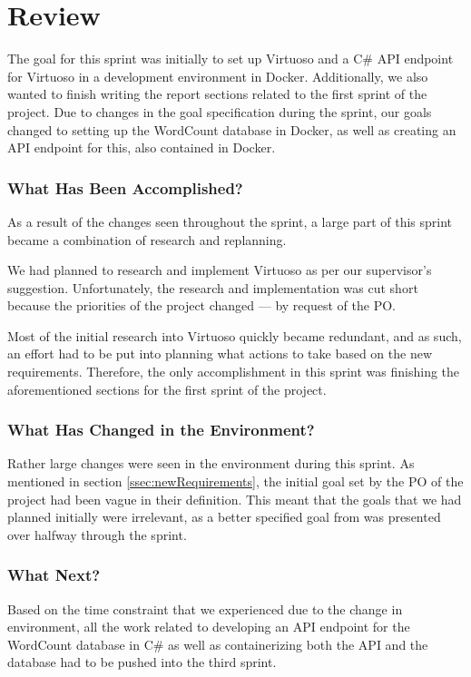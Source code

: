 \section{Review}
The goal for this sprint was initially to set up Virtuoso and a C\# API endpoint for Virtuoso in a development environment in Docker. 
Additionally, we also wanted to finish writing the report sections related to the first sprint of the \knox{} project. 
Due to changes in the goal specification during the sprint, our goals changed to setting up the WordCount database in Docker, as well as creating an API endpoint for this, also contained in Docker.

\subsubsection*{What Has Been Accomplished?}
As a result of the changes seen throughout the sprint, a large part of this sprint became a combination of research and replanning. 

We had planned to research and implement Virtuoso as per our supervisor's suggestion.
Unfortunately, the research and implementation was cut short because the priorities of the \knox{} project changed --- by request of the \knox{} PO.

Most of the initial research into Virtuoso quickly became redundant, and as such, an effort had to be put into planning what actions to take based on the new requirements. 
Therefore, the only accomplishment in this sprint was finishing the aforementioned sections for the first sprint of the \knox{} project.  



\subsubsection*{What Has Changed in the Environment?}
Rather large changes were seen in the environment during this sprint. As mentioned in section \ref{ssec:newRequirements}, the initial goal set by the PO of the \knox{} project had been vague in their definition. 
This meant that the goals that we had planned initially were irrelevant, as a better specified goal from \knox{} was presented over halfway through the sprint. 

\subsubsection*{What Next?}
Based on the time constraint that we experienced due to the change in environment, all the work related to developing an API endpoint for the WordCount database in C\# as well as containerizing both the API and the database had to be pushed into the third sprint.
